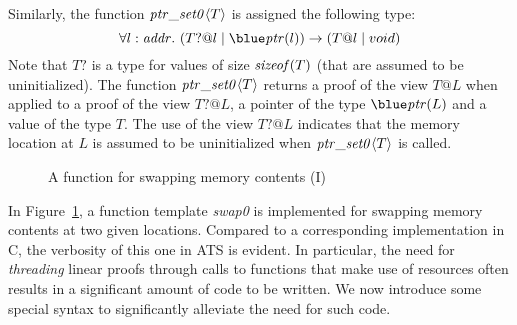 Similarly, the function ${\it ptr\_set0}\langle T\rangle$ is
assigned the following type:
\[\forall l:\saddr.~(T? @ l \mid \tptr (l))\timp(T@l \mid void)\]
Note that $T?$ is a type for values of size ${\it sizeof}(T)$ (that are
assumed to be uninitialized).  The function ${\it ptr\_set0}\langle
T\rangle$ returns a proof of the view $T@L$ when applied to a proof of the
view $T?@L$, a pointer of the type $\tptr(L)$ and a value of the type
$T$. The use of the view $T?@L$ indicates that the memory location at $L$
is assumed to be uninitialized when ${\it ptr\_set0}\langle T\rangle$ is
called.

\begin{figure}

\caption{A function for swapping memory contents (I)}
\label{figure:swap0_example.dats}
\end{figure}
In Figure~\ref{figure:swap0_example.dats}, a function template {\it swap0}
is implemented for swapping memory contents at two given
locations. Compared to a corresponding implementation in C, the verbosity
of this one in ATS is evident. In particular, the need for {\it threading}
linear proofs through calls to functions that make use of resources often
results in a significant amount of code to be written. We now introduce
some special syntax to significantly alleviate the need for such code.

